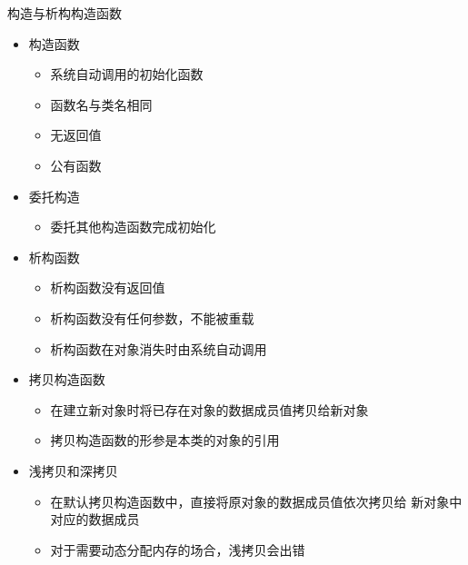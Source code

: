 \begin{frame}[t, fragile]{构造与析构}{构造函数}%
  \stretchon
  \begin{itemize}
  \item 构造函数
    \begin{itemize}
      \scriptsize
    \item 系统自动调用的初始化函数
    \item 函数名与类名相同
    \item 无返回值
    \item 公有函数
    \end{itemize}
  \item 委托构造
    \begin{itemize}
    \item 委托其他构造函数完成初始化
    \end{itemize}
  \item 析构函数
    \begin{itemize}
      \scriptsize
    \item 析构函数没有返回值
    \item 析构函数没有任何参数，不能被重载
    \item 析构函数在对象消失时由系统自动调用
    \end{itemize}
  \item 拷贝构造函数
    \begin{itemize}
      \scriptsize
    \item 在建立新对象时将已存在对象的数据成员值拷贝给新对象
    \item 拷贝构造函数的形参是本类的对象的引用
    \end{itemize}
  \item 浅拷贝和深拷贝
    \begin{itemize}
      \scriptsize
    \item 在默认拷贝构造函数中，直接将原对象的数据成员值依次拷贝给
      新对象中对应的数据成员
    \item 对于需要动态分配内存的场合，浅拷贝会出错
    \end{itemize}
  \end{itemize}
  \stretchoff
\end{frame}

